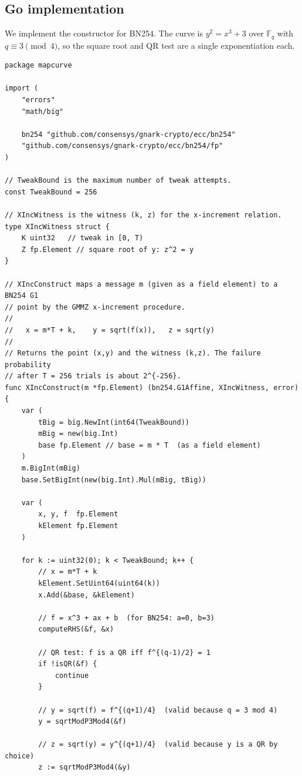 \documentclass[11pt,a4paper]{article}
\theoremstyle{definition}
\newcommand{\F}{\mathbb{F}}
\begin{document}
\subsection{Go implementation}
\label{subsec:go-xinc}

We implement the constructor for BN254. The curve is
$y^2 = x^3 + 3$ over $\F_q$ with $q \equiv 3 \pmod 4$, so the square root
and QR test are a single exponentiation each.

\begin{lstlisting}[caption={GMMZ x-increment constructor (Go, BN254).},
label={lst:x-inc-go}]
package mapcurve

import (
    "errors"
    "math/big"

    bn254 "github.com/consensys/gnark-crypto/ecc/bn254"
    "github.com/consensys/gnark-crypto/ecc/bn254/fp"
)

// TweakBound is the maximum number of tweak attempts.
const TweakBound = 256

// XIncWitness is the witness (k, z) for the x-increment relation.
type XIncWitness struct {
    K uint32   // tweak in [0, T)
    Z fp.Element // square root of y: z^2 = y
}

// XIncConstruct maps a message m (given as a field element) to a BN254 G1
// point by the GMMZ x-increment procedure.
//
//   x = m*T + k,    y = sqrt(f(x)),   z = sqrt(y)
//
// Returns the point (x,y) and the witness (k,z). The failure probability
// after T = 256 trials is about 2^{-256}.
func XIncConstruct(m *fp.Element) (bn254.G1Affine, XIncWitness, error) {
    var (
        tBig = big.NewInt(int64(TweakBound))
        mBig = new(big.Int)
        base fp.Element // base = m * T  (as a field element)
    )
    m.BigInt(mBig)
    base.SetBigInt(new(big.Int).Mul(mBig, tBig))

    var (
        x, y, f  fp.Element
        kElement fp.Element
    )

    for k := uint32(0); k < TweakBound; k++ {
        // x = m*T + k
        kElement.SetUint64(uint64(k))
        x.Add(&base, &kElement)

        // f = x^3 + ax + b  (for BN254: a=0, b=3)
        computeRHS(&f, &x)

        // QR test: f is a QR iff f^{(q-1)/2} = 1
        if !isQR(&f) {
            continue
        }

        // y = sqrt(f) = f^{(q+1)/4}  (valid because q = 3 mod 4)
        y = sqrtModP3Mod4(&f)

        // z = sqrt(y) = y^{(q+1)/4}  (valid because y is a QR by choice)
        z := sqrtModP3Mod4(&y)


\end{lstlisting}
\end{document}
